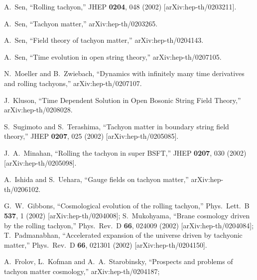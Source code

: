 \documentclass[a4paper,12pt]{article} \textheight=8.5truein
\begin{document}
\begingroup\raggedright\begin{thebibliography}{10}

A.~Sen,
``Rolling tachyon,''
JHEP {\bf 0204}, 048 (2002)
[arXiv:hep-th/0203211].

A.~Sen,
``Tachyon matter,''
arXiv:hep-th/0203265.

A.~Sen,
``Field theory of tachyon matter,''
arXiv:hep-th/0204143.

A.~Sen,
``Time evolution in open string theory,''
arXiv:hep-th/0207105.

N.~Moeller and B.~Zwiebach, ``Dynamics with infinitely many time
derivatives and rolling tachyons,'' arXiv:hep-th/0207107.

J.~Kluson, ``Time Dependent Solution in Open Bosonic String Field
Theory,'' arXiv:hep-th/0208028.

S.~Sugimoto and S.~Terashima,
``Tachyon matter in boundary string field theory,''
JHEP {\bf 0207}, 025 (2002)
[arXiv:hep-th/0205085].

J.~A.~Minahan,
``Rolling the tachyon in super BSFT,''
JHEP {\bf 0207}, 030 (2002)
[arXiv:hep-th/0205098].

A.~Ishida and S.~Uehara, ``Gauge fields on tachyon matter,''
arXiv:hep-th/0206102.

G.~W.~Gibbons, ``Cosmological evolution of the rolling tachyon,''
Phys.\ Lett.\ B {\bf 537}, 1 (2002) [arXiv:hep-th/0204008];
S.~Mukohyama, ``Brane cosmology driven by the rolling tachyon,''
Phys.\ Rev.\ D {\bf 66}, 024009 (2002) [arXiv:hep-th/0204084];
T.~Padmanabhan,
``Accelerated expansion of the universe driven by tachyonic matter,''
Phys.\ Rev.\ D {\bf 66}, 021301 (2002)
[arXiv:hep-th/0204150].

A.~Frolov, L.~Kofman and A.~A.~Starobinsky, ``Prospects and
problems of tachyon matter cosmology,'' arXiv:hep-th/0204187;



\end{thebibliography}
\end{document}
